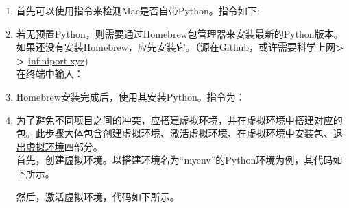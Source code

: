 \documentclass[11pt]{article}
\begin{document}
    \begin{enumerate}
    	\item 首先可以使用指令来检测Mac是否自带Python。指令如下:
    	\begin{center}
    	\end{center}
    	
    	\item 若无预置Python，则需要通过Homebrew包管理器来安装最新的Python版本。如果还没有安装Homebrew，应先安装它。（源在Github，或许需要科学上网\textbf{> >} \underline{infiniport.xyz})\\
    	在终端中输入：
    	\begin{center}
    	\end{center}
    	
    	\item Homebrew安装完成后，使用其安装Python。指令为：
    	\begin{center}
    	\end{center}
    	
    	\item 为了避免不同项目之间的冲突，应搭建虚拟环境，并在虚拟环境中搭建对应的包。此步骤大体包含\underline{创建虚拟环境}、\underline{激活虚拟环境}、\underline{在虚拟环境中安装包}、\underline{退出虚拟环境}四部分。\\
    	首先，创建虚拟环境。以搭建环境名为“myenv”的Python环境为例，其代码如下所示。
    	\begin{center}
    	\end{center}
    	
    	然后，激活虚拟环境，代码如下所示。
    	\begin{center}
    	\end{center}
    	

\end{enumerate}
\end{document}
